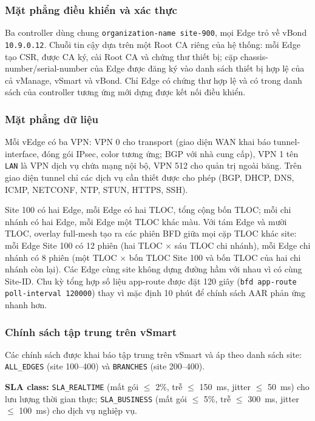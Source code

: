 \subsubsection{Mặt phẳng điều khiển và xác thực}

Ba controller dùng chung \texttt{organization-name site-900}, mọi Edge trỏ về vBond \texttt{10.9.0.12}. Chuỗi tin cậy dựa trên một Root CA riêng của hệ thống: mỗi Edge tạo CSR, được CA ký, cài Root CA và chứng thư thiết bị; cặp chassis-number/serial-number của Edge được đăng ký vào danh sách thiết bị hợp lệ của cả vManage, vSmart và vBond. Chỉ Edge có chứng thư hợp lệ và có trong danh sách của controller tương ứng mới dựng được kết nối điều khiển.

\subsubsection{Mặt phẳng dữ liệu}

Mỗi vEdge có ba VPN: VPN 0 cho transport (giao diện WAN khai báo tunnel-interface, đóng gói IPsec, color tương ứng; BGP với nhà cung cấp), VPN 1 tên \texttt{LAN} là VPN dịch vụ chứa mạng nội bộ, VPN 512 cho quản trị ngoài băng. Trên giao diện tunnel chỉ các dịch vụ cần thiết được cho phép (BGP, DHCP, DNS, ICMP, NETCONF, NTP, STUN, HTTPS, SSH).

Site 100 có hai Edge, mỗi Edge có hai TLOC, tổng cộng bốn TLOC; mỗi chi nhánh có hai Edge, mỗi Edge một TLOC khác màu. Với tám Edge và mười TLOC, overlay full-mesh tạo ra các phiên BFD giữa mọi cặp TLOC khác site: mỗi Edge Site 100 có 12 phiên (hai TLOC $\times$ sáu TLOC chi nhánh), mỗi Edge chi nhánh có 8 phiên (một TLOC $\times$ bốn TLOC Site 100 và bốn TLOC của hai chi nhánh còn lại). Các Edge cùng site không dựng đường hầm với nhau vì có cùng Site-ID. Chu kỳ tổng hợp số liệu app-route được đặt 120 giây (\texttt{bfd app-route poll-interval 120000}) thay vì mặc định 10 phút để chính sách AAR phản ứng nhanh hơn.

\subsubsection{Chính sách tập trung trên vSmart}

Các chính sách được khai báo tập trung trên vSmart và áp theo danh sách site: \texttt{ALL\_EDGES} (site 100--400) và \texttt{BRANCHES} (site 200--400).

\textbf{SLA class:} \texttt{SLA\_REALTIME} (mất gói $\le$ 2\%, trễ $\le$ 150~ms, jitter $\le$ 50~ms) cho lưu lượng thời gian thực; \texttt{SLA\_BUSINESS} (mất gói $\le$ 5\%, trễ $\le$ 300~ms, jitter $\le$ 100~ms) cho dịch vụ nghiệp vụ.

